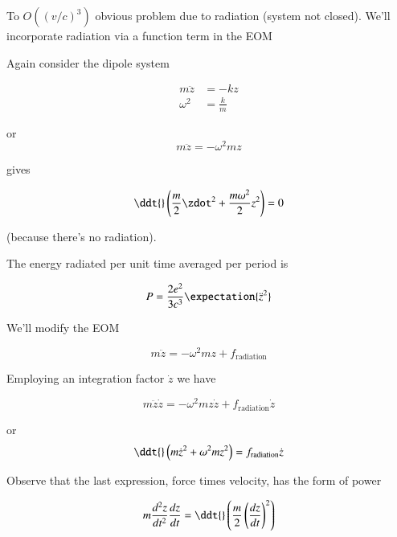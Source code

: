 To $O((v/c)^3)$ obvious problem due to radiation (system not closed).  We'll incorporate radiation via a function term in the EOM

Again consider the dipole system

\begin{align}\label{eqn:relativisticElectrodynamicsL26:110}
m \ddot{z} &= -k z \\
\omega^2 &= \frac{k}{m}
\end{align}

or
\begin{equation}\label{eqn:relativisticElectrodynamicsL26:130}
m \ddot{z} = -\omega^2 m z
\end{equation}

gives

\begin{equation}\label{eqn:relativisticElectrodynamicsL26:150}
\ddt{}\left( \frac{m}{2} \zdot^2 + \frac{ m \omega^2 }{2} z^2 \right) = 0 
\end{equation}

(because there's no radiation).

The energy radiated per unit time averaged per period is

\begin{equation}\label{eqn:relativisticElectrodynamicsL26:170}
P = \frac{ 2 e^2 }{ 3 c^3} \expectation{ \ddot{z}^2 }
\end{equation}

We'll modify the EOM

\begin{equation}\label{eqn:relativisticElectrodynamicsL26:190}
m \ddot{z} = -\omega^2 m z + f_{\text{radiation}}
\end{equation}

Employing an integration factor $\dot{z}$ we have

\begin{equation}\label{eqn:relativisticElectrodynamicsL26:210}
m \ddot{z} \dot{z} = -\omega^2 m z \dot{z} + f_{\text{radiation}} \dot{z}
\end{equation}

or
\begin{equation}\label{eqn:relativisticElectrodynamicsL26:230}
\ddt{} 
\left( m \dot{z}^2 + \omega^2 m z^2 \right) 
= 
f_{\text{radiation}} \dot{z}
\end{equation}

Observe that the last expression, force times velocity, has the form of power

\begin{equation}\label{eqn:relativisticElectrodynamicsL26:250}
m \frac{d^2 z}{dt^2} \frac{dz}{dt} = \ddt{} \left( \frac{m}{2} \left( \frac{dz}{dt} \right)^2 \right)
\end{equation}

